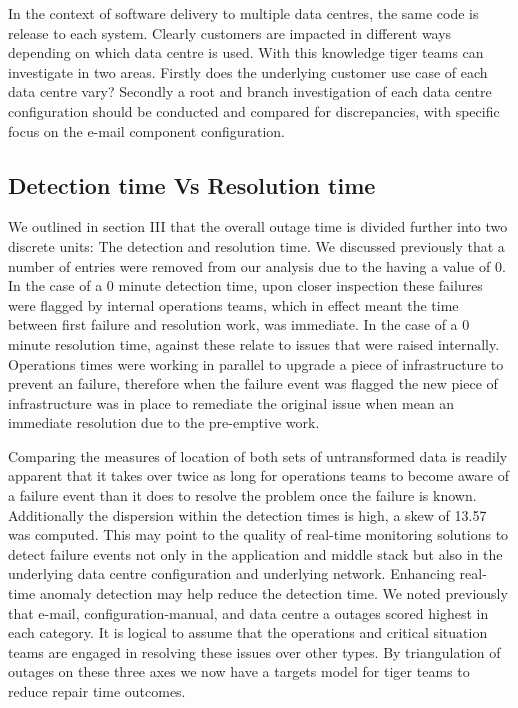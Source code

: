 \documentclass[conference]{IEEEtran}
\begin{document}
In the context of software delivery to multiple data centres, the same code is release to each system. Clearly customers are impacted in different ways depending on which data centre is used. With this knowledge tiger teams can investigate in two areas. Firstly does the underlying customer use case of each data centre vary? Secondly a root and branch investigation of each data centre configuration should be conducted and compared for discrepancies, with specific focus on the e-mail component configuration. \par

\subsection{Detection time Vs Resolution time}

We outlined in section III that the overall outage time is divided further into two discrete units: The detection and resolution time. We discussed previously that a number of entries were removed from our analysis due to the having a value of 0. In the case of a 0 minute detection time, upon closer inspection these failures were flagged by internal operations teams, which in effect meant the time between first failure and resolution work, was immediate. In the case of a 0 minute resolution time, against these relate to issues that were raised internally. Operations times were working in parallel to upgrade a piece of infrastructure to prevent an failure, therefore when the failure event was flagged the new piece of infrastructure was in place to remediate the original issue when mean an immediate resolution due to the pre-emptive work. \par

Comparing the measures of location of both sets of untransformed data is readily apparent that it takes over twice as long for operations teams to become aware of a failure event than it does to resolve the problem once the failure is known. Additionally the dispersion within the detection times is high, a skew of 13.57 was computed. This may point to the quality of real-time monitoring solutions to detect failure events not only in the application and middle stack but also in the underlying data centre configuration and underlying network. Enhancing real-time anomaly detection may help reduce the detection time. We noted previously that e-mail, configuration-manual, and data centre a outages scored highest in each category. It is logical to assume that the operations and critical situation teams are engaged in resolving these issues over other types. By triangulation of outages on these three axes we now have a targets model for tiger teams to reduce repair time outcomes. \par
\end{document}
